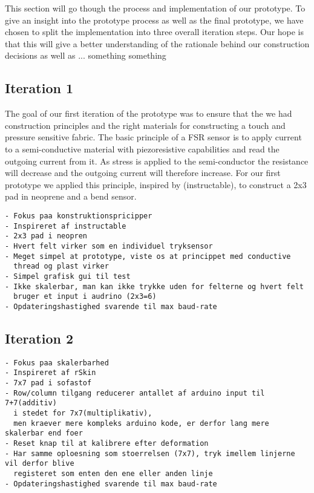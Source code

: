 This section will go though the process and implementation of our prototype.
To give an insight into the prototype process as well as the final prototype, we have chosen to split the implementation into three overall iteration steps.
Our hope is that this will give a better understanding of the rationale behind our construction decisions as well as ... something something   

\subsection{Iteration 1}
The goal of our first iteration of the prototype was to ensure that the we had construction principles and the right materials for constructing a touch and pressure sensitive fabric.
The basic principle of a FSR sensor is to apply current to a semi-conductive material with piezoresistive capabilities and read the outgoing current from it.
As stress is applied to the semi-conductor the resistance will decrease and the outgoing current will therefore increase.
For our first prototype we applied this principle, inspired by (instructable), to construct a 2x3 pad in neoprene and a bend sensor.

\begin{verbatim}
- Fokus paa konstruktionspricipper
- Inspireret af instructable
- 2x3 pad i neopren
- Hvert felt virker som en individuel tryksensor
- Meget simpel at prototype, viste os at princippet med conductive 
  thread og plast virker
- Simpel grafisk gui til test
- Ikke skalerbar, man kan ikke trykke uden for felterne og hvert felt
  bruger et input i audrino (2x3=6)
- Opdateringshastighed svarende til max baud-rate
\end{verbatim}
\subsection{Iteration 2}
\begin{verbatim}
- Fokus paa skalerbarhed
- Inspireret af rSkin
- 7x7 pad i sofastof
- Row/column tilgang reducerer antallet af arduino input til 7+7(additiv)
  i stedet for 7x7(multiplikativ),
  men kraever mere kompleks arduino kode, er derfor lang mere skalerbar end foer
- Reset knap til at kalibrere efter deformation
- Har samme oploesning som stoerrelsen (7x7), tryk imellem linjerne vil derfor blive 
  registeret som enten den ene eller anden linje
- Opdateringshastighed svarende til max baud-rate
\end{verbatim}
